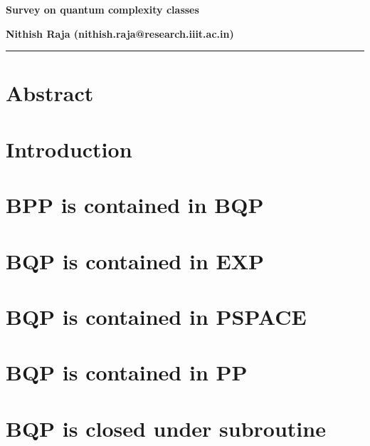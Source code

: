 



\noindent\textbf{\Large Survey on quantum complexity classes}
\vspace{2em}

\noindent
\textbf{Nithish Raja (nithish.raja@research.iiit.ac.in)}\\

\hrule

\section{Abstract}



\section{Introduction}



\section{BPP is contained in BQP}



\section{BQP is contained in EXP}



\section{BQP is contained in PSPACE}



\section{BQP is contained in PP}



\section{BQP is closed under subroutine}







